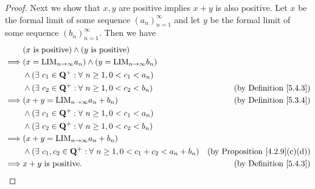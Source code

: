 \begin{proof}
    Next we show that \(x, y\) are positive implies \(x + y\) is also positive.
    Let \(x\) be the formal limit of some sequence \((a_n)_{n = 1}^{\infty}\) and let \(y\) be the formal limit of some sequence \((b_n)_{n = 1}^{\infty}\).
    Then we have
    \begin{align*}
                 & (x \text{ is positive}) \land (y \text{ is positive})                                                                                 \\
        \implies & (x = \text{LIM}_{n \to \infty} a_n) \land (y = \text{LIM}_{n \to \infty} b_n)                                                         \\
                 & \land (\exists\ c_1 \in \mathbf{Q}^+ : \forall\ n \geq 1, 0 < c_1 < a_n)                                                              \\
                 & \land (\exists\ c_2 \in \mathbf{Q}^+ : \forall\ n \geq 1, 0 < c_2 < b_n)                  & \text{(by Definition \ref{5.4.3})}        \\
        \implies & (x + y = \text{LIM}_{n \to \infty} a_n + b_n)                                             & \text{(by Definition \ref{5.3.4})}        \\
                 & \land (\exists\ c_1 \in \mathbf{Q}^+ : \forall\ n \geq 1, 0 < c_1 < a_n)                                                              \\
                 & \land (\exists\ c_2 \in \mathbf{Q}^+ : \forall\ n \geq 1, 0 < c_2 < b_n)                                                              \\
        \implies & (x + y = \text{LIM}_{n \to \infty} a_n + b_n)                                                                                         \\
                 & \land (\exists\ c_1, c_2 \in \mathbf{Q}^+ : \forall\ n \geq 1, 0 < c_1 + c_2 < a_n + b_n) & \text{(by Proposition \ref{4.2.9}(c)(d))} \\
        \implies & x + y \text{ is positive}.                                                                & \text{(by Definition \ref{5.4.3})}
    \end{align*}


\end{proof}
